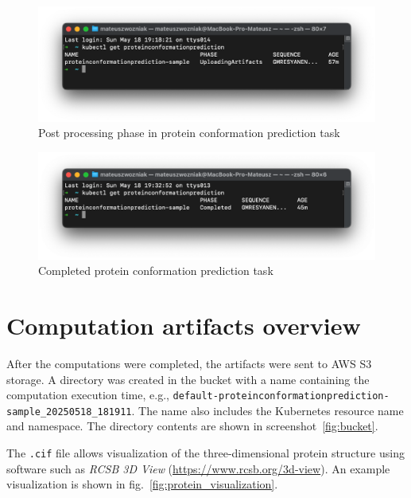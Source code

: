\begin{figure}[htbp]
    \centering
    \includegraphics[width=\textwidth]{images/proteinconformationprediction_uploading_terminal}
    \caption{Post processing phase in protein conformation prediction task}
    \label{fig:proteinconformationprediction_uploading_terminal}
\end{figure}

\begin{figure}[htbp]
    \centering
    \includegraphics[width=\textwidth]{images/proteinconformationprediction_completed_terminal}
    \caption{Completed protein conformation prediction task}
    \label{fig:proteinconformationprediction_completed_terminal}
\end{figure}

\section{Computation artifacts overview}

After the computations were completed, the artifacts were sent to AWS S3 storage.
A directory was created in the bucket with a name containing the computation execution time, e.g., \texttt{default-proteinconformationprediction-sample\_20250518\_181911}.
The name also includes the Kubernetes resource name and namespace.
The directory contents are shown in screenshot~\ref{fig:bucket}.

The \texttt{.cif} file allows visualization of the three-dimensional protein structure using software such as \textit{RCSB 3D View} (\url{https://www.rcsb.org/3d-view}).
An example visualization is shown in fig.~\ref{fig:protein_visualization}.

